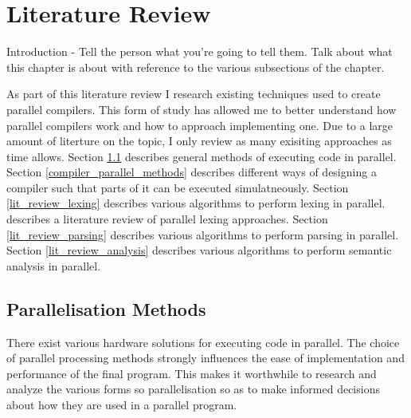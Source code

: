 \chapter{Literature Review} \label{litreview}
\begin{sectionplan}
Introduction - Tell the person what you're going to tell them. Talk about what
this chapter is about with reference to the various subsections of the chapter.
\end{sectionplan}

As part of this literature review I research existing techniques used to create
parallel compilers. This form of study has allowed me to better understand how
parallel compilers work and how to approach implementing one. Due to a large
amount of literture on the topic, I only review as many exisiting approaches
as time allows.
\newline \newline
Section \ref{parallelisation_methods} describes general methods of executing
code in parallel.
\newline \newline
Section \ref{compiler_parallel_methods} describes different ways of designing a compiler
such that parts of it can be executed simulatneously.
\newline \newline
Section \ref{lit_review_lexing} describes various algorithms to perform lexing
in parallel.\cite{pai_t_systematic_2020} describes a literature review of parallel lexing
approaches.
\newline \newline
Section \ref{lit_review_parsing} describes various algorithms to perform parsing
in parallel.
\newline \newline
Section \ref{lit_review_analysis} describes various algorithms to perform semantic
analysis in parallel.
\newline \newline

\section{Parallelisation Methods} \label{parallelisation_methods}
There exist various hardware solutions for executing code in parallel.
The choice of parallel processing methods strongly influences the ease of
implementation and performance of the final program. This makes it worthwhile to
research and analyze the various forms so parallelisation so as to make informed
decisions about how they are used in a parallel program.

